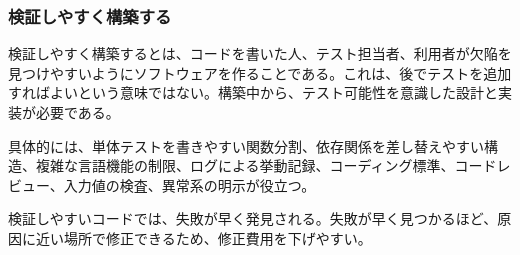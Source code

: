 \subsubsection{検証しやすく構築する}

検証しやすく構築するとは、コードを書いた人、テスト担当者、利用者が欠陥を見つけやすいようにソフトウェアを作ることである。これは、後でテストを追加すればよいという意味ではない。構築中から、テスト可能性を意識した設計と実装が必要である。

具体的には、単体テストを書きやすい関数分割、依存関係を差し替えやすい構造、複雑な言語機能の制限、ログによる挙動記録、コーディング標準、コードレビュー、入力値の検査、異常系の明示が役立つ。

検証しやすいコードでは、失敗が早く発見される。失敗が早く見つかるほど、原因に近い場所で修正できるため、修正費用を下げやすい。
